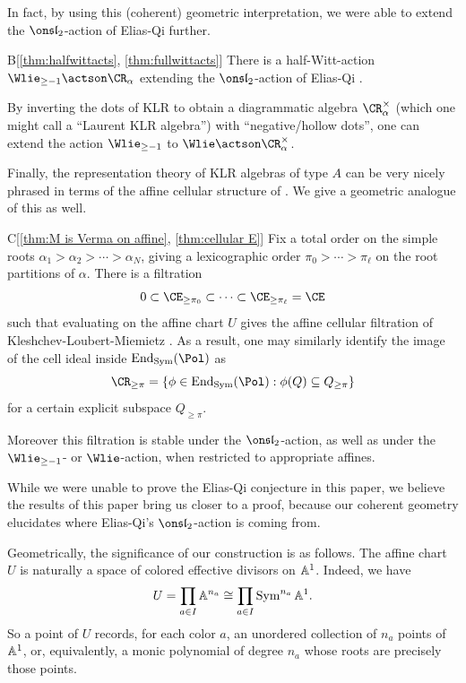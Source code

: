 \documentclass[11pt,reqno]{amsart}
\begin{document}
In fact, by using this (coherent) geometric interpretation, we were able to extend the $\sl_2$-action of Elias-Qi further.
\begin{mytheorem}{B}[\ref{thm:halfwittacts}, \ref{thm:fullwittacts}]\label{thm:B}
    There is a half-Witt-action $\Wlie_{\ge-1}\actson \CR_\alpha$ extending the $\sl_2$-action of Elias-Qi \cite{EQ23}. 

    By inverting the dots of KLR to obtain a diagrammatic algebra $\CR_\alpha^\times$ (which one might call a ``Laurent KLR algebra'') with ``negative/hollow dots'', one can extend the action $\Wlie_{\ge-1}$ to $\Wlie\actson \CR_\alpha^\times$. 
\end{mytheorem}

Finally, the representation theory of KLR algebras of type $A$ can be very nicely phrased in terms of the affine cellular structure of \cite{kleshchev2013affine}. We give a geometric analogue of this as well.
\begin{mytheorem}{C}[\ref{thm:M is Verma on affine}, \ref{thm:cellular E}]\label{thm:C}
    Fix a total order on the simple roots $\alpha_1>\alpha_2>\cdots>\alpha_N$, giving a lexicographic order $\pi_0>\cdots>\pi_\ell$ on the root partitions of $\alpha$. There is a filtration
    \[0\subset\CE_{\ge\pi_0}\subset\cdots\subset\CE_{\ge\pi_\ell}=\CE\] 
    such that evaluating on the affine chart $U$ gives the affine cellular filtration of Kleshchev-Loubert-Miemietz \cite{kleshchev2013affine}. As a result, one may similarly identify the image of the cell ideal inside $\End_{\Sym}(\Pol)$ as
    \[\CR_{\ge\pi}=\{\phi\in\End_{\Sym}(\Pol):\phi(Q)\subseteq Q_{\ge\pi}\}\] 
    for a certain explicit subspace $Q_{\ge\pi}$.
    
    Moreover this filtration is stable under the $\sl_2$-action, as well as under the $\Wlie_{\ge-1}$- or $\Wlie$-action, when restricted to appropriate affines.
\end{mytheorem}

While we were unable to prove the Elias-Qi conjecture in this paper, we believe the results of this paper bring us closer to a proof, because our coherent geometry elucidates where Elias-Qi's $\sl_2$-action is coming from. 

Geometrically, the significance of our construction is as follows. The affine chart $U$ is naturally a space of colored effective divisors on $\mathbb A^1$. Indeed, we have \[U=\prod_{a\in I}\mathbb A^{n_a}\cong \prod_{a\in I}\operatorname{Sym}^{n_a}\mathbb A^1.\] So  a point of $U$ records, for each color $a$, an unordered collection of $n_a$ points of $\mathbb A^1$, or, equivalently, a monic polynomial of degree $n_a$ whose roots are precisely those points.
\end{document}
